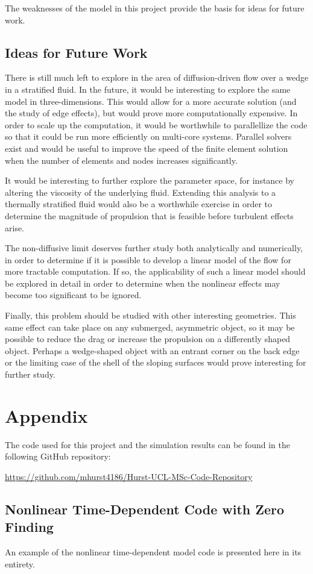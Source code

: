 \documentclass[12pt]{article}
\begin{document}
The weaknesses of the model in this project provide the basis for ideas for future work.

\subsection{Ideas for Future Work}

There is still much left to explore in the area of diffusion-driven flow over a wedge in a stratified fluid. In the future, it would be interesting to explore the same model in three-dimensions. This would allow for a more accurate solution (and the study of edge effects), but would prove more computationally expensive. In order to scale up the computation, it would be worthwhile to parallellize the code so that it could be run more efficiently on multi-core systems. Parallel solvers exist and would be useful to improve the speed of the finite element solution when the number of elements and nodes increases significantly.

It would be interesting to further explore the parameter space, for instance by altering the viscosity of the underlying fluid. Extending this analysis to a thermally stratified fluid would also be a worthwhile exercise in order to determine the magnitude of propulsion that is feasible before turbulent effects arise.

The non-diffusive limit deserves further study both analytically and numerically, in order to determine if it is possible to develop a linear model of the flow for more tractable computation. If so, the applicability of such a linear model should be explored in detail in order to determine when the nonlinear effects may become too significant to be ignored.

Finally, this problem should be studied with other interesting geometries. This same effect can take place on any submerged, asymmetric object, so it may be possible to reduce the drag or increase the propulsion on a differently shaped object. Perhaps a wedge-shaped object with an entrant corner on the back edge or the limiting case of the shell of the sloping surfaces would prove interesting for further study.

\newpage

\printbibliography

\newpage

\section*{Appendix}

The code used for this project and the simulation results can be found in the following GitHub repository:

\url{https://github.com/mhurst4186/Hurst-UCL-MSc-Code-Repository}

\subsection*{Nonlinear Time-Dependent Code with Zero Finding}

An example of the nonlinear time-dependent model code is presented here in its entirety.


\end{document}

